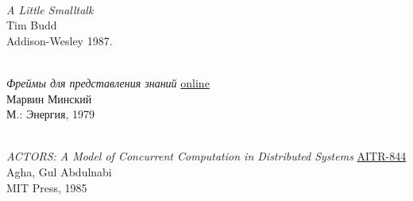 \begin{thebibliography}{9}
 \\
\emph{A Little Smalltalk}\\
Tim Budd\\
Addison-Wesley 1987.

 \\
\emph{Фреймы для представления знаний}
\href{https://royallib.com/book/minskiy_marvin/freymi_dlya_predstavleniya_znaniy.html}{online}\\
Марвин Минский\\
М.: Энергия, 1979

\clearpage
{} \\
\emph{ACTORS: A Model of Concurrent Computation in Distributed Systems} \href{https://dspace.mit.edu/handle/1721.1/6952}{AITR-844}\\
Agha, Gul Abdulnabi\\
MIT Press, 1985

\end{thebibliography}
